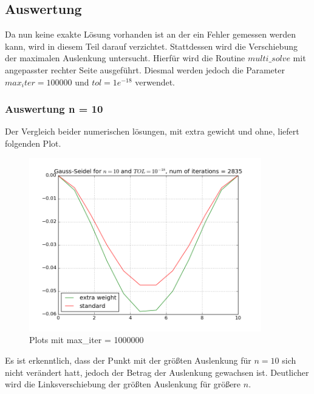 \documentclass[12pt,titlepage]{article}
\begin{document}
	\subsection{Auswertung}
		Da nun keine exakte Lösung vorhanden ist an der ein Fehler gemessen werden kann, wird in diesem Teil darauf verzichtet.
		Stattdessen wird die Verschiebung der maximalen Auslenkung untersucht. Hierfür wird die Routine $multi\_solve$ mit angepasster rechter Seite
		ausgeführt. Diesmal werden jedoch die Parameter $max_iter=100000$ und $tol=1e^{-18}$ verwendet.
		
		\subsubsection{Auswertung n = 10}
			Der Vergleich beider numerischen lösungen, mit extra gewicht und ohne, liefert folgenden Plot.
			
		\begin{figure}[H] 
	 		\centering
	 		\includegraphics[width=0.9\textwidth]{bend.png}
	 		\caption{Plots mit max\_iter = 1000000}
	 		\label{fig:Bild5}
	 	\end{figure}
	 	
	 	Es ist erkenntlich, dass der Punkt mit der größten Auslenkung für $n = 10$ sich nicht verändert hatt, jedoch der Betrag der Auslenkung gewachsen ist.
	 	Deutlicher wird die Linksverschiebung der größten Auslenkung für größere $n$.
	 	\newpage
\end{document}
